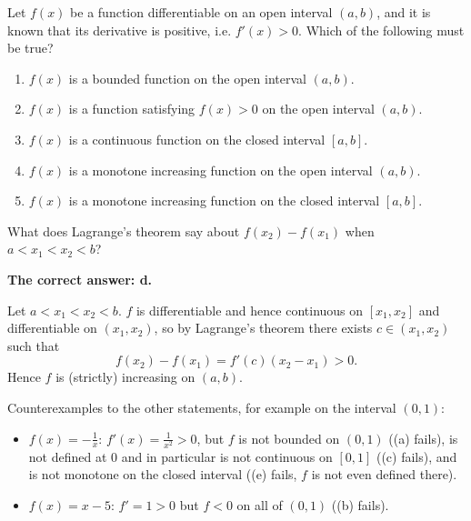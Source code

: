 
\begin{question}
Let $f(x)$ be a function differentiable on an open interval $(a,b)$, and it is known that its derivative is positive, i.e. $f'(x)>0$. Which of the following must be true?
\begin{enumerate}
  \item $f(x)$ is a bounded function on the open interval $(a,b)$.
  \item $f(x)$ is a function satisfying $f(x)>0$ on the open interval $(a,b)$.
  \item $f(x)$ is a continuous function on the closed interval $[a,b]$.
  \item $f(x)$ is a monotone increasing function on the open interval $(a,b)$.
  \item $f(x)$ is a monotone increasing function on the closed interval $[a,b]$.
\end{enumerate}
\end{question}

\begin{hint}
What does Lagrange's theorem say about $f(x_2)-f(x_1)$ when $a<x_1<x_2<b$?
\end{hint}

\begin{solution}
\textbf{The correct answer: d.}

Let $a<x_1<x_2<b$. $f$ is differentiable and hence continuous on $[x_1,x_2]$ and differentiable on $(x_1,x_2)$, so by Lagrange's theorem there exists $c\in(x_1,x_2)$ such that
\[ f(x_2)-f(x_1)=f'(c)(x_2-x_1)>0 . \]
Hence $f$ is (strictly) increasing on $(a,b)$.

Counterexamples to the other statements, for example on the interval $(0,1)$:
\begin{itemize}
  \item $f(x)=-\frac1x$: $f'(x)=\frac1{x^2}>0$, but $f$ is not bounded on $(0,1)$ ((a) fails), is not defined at $0$ and in particular is not continuous on $[0,1]$ ((c) fails), and is not monotone on the closed interval ((e) fails, $f$ is not even defined there).
  \item $f(x)=x-5$: $f'=1>0$ but $f<0$ on all of $(0,1)$ ((b) fails).
\end{itemize}
\end{solution}
